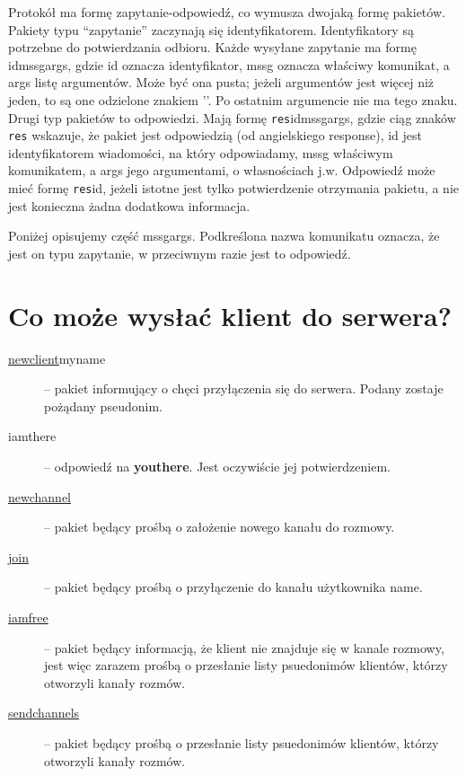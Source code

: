 \documentclass[a4paper, 10pt]{article}
\begin{document}
\tableofcontents

\newpage

Protokół ma formę zapytanie-odpowiedź, co wymusza dwojaką formę pakietów. Pakiety typu ``zapytanie'' zaczynają się identyfikatorem. Identyfikatory są potrzebne do potwierdzania odbioru. Każde wysyłane zapytanie ma formę id\textbar mssg\textbar args, gdzie id oznacza identyfikator, mssg oznacza właściwy komunikat, a args listę argumentów. Może być ona pusta; jeżeli argumentów jest więcej niż jeden, to są one odzielone znakiem '\textbar '. Po ostatnim argumencie nie ma tego znaku. Drugi typ pakietów to odpowiedzi. Mają formę \texttt{res}\textbar id\textbar mssg\textbar args, gdzie ciąg znaków \texttt{res} wskazuje, że pakiet jest odpowiedzią (od angielskiego response), id jest identyfikatorem wiadomości, na który odpowiadamy, mssg właściwym komunikatem, a args jego argumentami, o własnościach j.w. Odpowiedź może mieć formę \texttt{res}\textbar id, jeżeli istotne jest tylko potwierdzenie otrzymania pakietu, a nie jest konieczna żadna dodatkowa informacja.

Poniżej opisujemy część mssg\textbar args. Podkreślona nazwa komunikatu oznacza, że jest on typu zapytanie, w przeciwnym razie jest to odpowiedź.

\section{Co może wysłać klient do serwera?}
\begin{description}
 \item[ \underline{newclient}\textbar myname] -- pakiet informujący o chęci przyłączenia się do serwera. Podany zostaje pożądany pseudonim.
 \item[ iamthere\textbar] -- odpowiedź na \textbf{youthere}. Jest oczywiście jej potwierdzeniem.
 \item[ \underline{newchannel}\textbar] -- pakiet będący prośbą o założenie nowego kanału do rozmowy.
 \item[ \underline{join}] -- pakiet będący prośbą o przyłączenie do kanału użytkownika {name}.
 \item[ \underline{iamfree}\textbar] -- pakiet będący informacją, że klient nie znajduje się w kanale rozmowy, jest więc zarazem prośbą o przesłanie listy psuedonimów klientów, którzy otworzyli kanały rozmów.
 \item[ \underline{sendchannels}\textbar] -- pakiet będący prośbą o przesłanie listy psuedonimów klientów, którzy otworzyli kanały rozmów.
\end{description}
\end{document}
